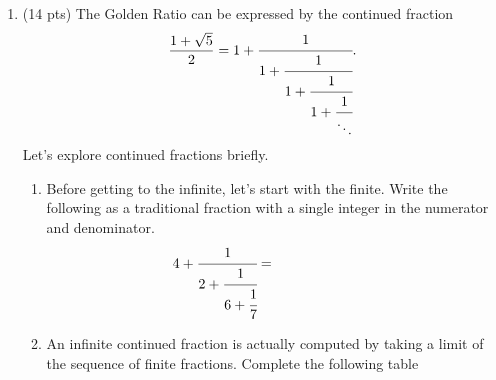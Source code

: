 \documentclass[12pt]{article}
\begin{document}
\begin{enumerate}
\begin{enumerate}
		\end{enumerate}
	\newpage
	\item (14 pts) The Golden Ratio can be expressed by the continued fraction
		\[\frac{1+\sqrt 5}{2}=1+\cfrac{1}{1+\cfrac{1}{1+\cfrac{1}{1+\cfrac{1}{\ddots}}}}.\]
		Let's explore continued fractions briefly.
		\begin{enumerate}
			\item Before getting to the infinite, let's start with the finite.
			 Write the following as a traditional fraction with a single integer in the numerator and denominator. 
			 $$\displaystyle 4+\cfrac{1}{2+\cfrac{1}{6+\cfrac{1}{7}}}=\hspace*{1in}\mbox{}$$

			 \item An infinite continued fraction is actually computed by taking a limit of the sequence of finite fractions.  Complete the following table
			 

\end{enumerate}
\end{enumerate}
\end{document}
